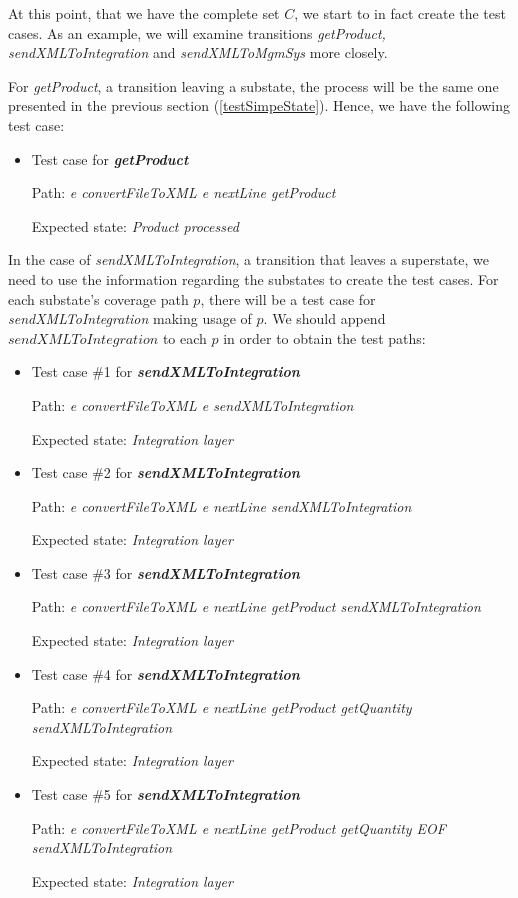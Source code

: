 At this point, that we have the complete set $C$, we start to in fact create the test cases. As an example, we will examine transitions \textit{getProduct, sendXMLToIntegration} and \textit{sendXMLToMgmSys} more closely.

For \textit{getProduct}, a transition leaving a substate, the process will be the same one presented in the previous section (\ref{testSimpeState}). Hence, we have the following test case:

\begin{itemize}

\item Test case for \textit{\textbf{getProduct}}

Path: \textit{e convertFileToXML e nextLine getProduct}

Expected state: \textit{Product processed}

\end{itemize}

In the case of \textit{sendXMLToIntegration}, a transition that leaves a superstate, we need to use the information regarding the substates to create the test cases. For each substate's coverage path $p$, there will be a test case for \textit{sendXMLToIntegration} making usage of $p$. We should append $sendXMLToIntegration$ to each $p$ in order to obtain the test paths:

\begin{itemize}

\item Test case \#1 for \textit{\textbf{sendXMLToIntegration}}

Path: \textit{e convertFileToXML e sendXMLToIntegration}

Expected state: \textit{Integration layer}

\item Test case \#2 for \textit{\textbf{sendXMLToIntegration}}

Path: \textit{e convertFileToXML e  nextLine sendXMLToIntegration}

Expected state: \textit{Integration layer}


\item Test case \#3 for \textit{\textbf{sendXMLToIntegration}}

Path: \textit{e convertFileToXML e  nextLine  getProduct sendXMLToIntegration}

Expected state: \textit{Integration layer}

\item Test case \#4 for \textit{\textbf{sendXMLToIntegration}}

Path: \textit{e convertFileToXML e  nextLine  getProduct  getQuantity sendXMLToIntegration}

Expected state: \textit{Integration layer}

\item Test case \#5 for \textit{\textbf{sendXMLToIntegration}}

Path: \textit{e convertFileToXML e  nextLine  getProduct  getQuantity EOF sendXMLToIntegration}

Expected state: \textit{Integration layer}

\end{itemize}

